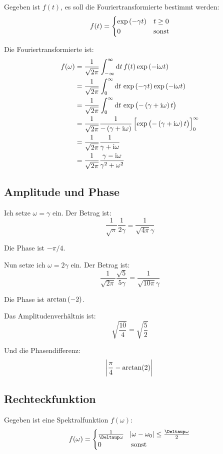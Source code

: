 Gegeben ist $f(t)$, es soll die Fouriertransformierte bestimmt werden:
\[
	f(t) = \begin{cases}
		\exp\del{-\gamma t} & t \geq 0 \\
									  0 & \text{sonst}
	\end{cases}
\]

Die Fouriertransformierte ist:
\begin{align*}
	f(\omega)
	&= \frac{1}{\sqrt{2 \pi}} \int_{-\infty}^\infty \dif t \, f(t) \exp\del{-\ii \omega t} \\
	&= \frac{1}{\sqrt{2 \pi}} \int_0^\infty \dif t \, \exp\del{-\gamma t} \exp\del{-\ii \omega t} \\
	&= \frac{1}{\sqrt{2 \pi}} \int_0^\infty \dif t \, \exp\del{-\del{\gamma + \ii \omega} t} \\
	&= \frac{1}{\sqrt{2 \pi}} \frac{1}{-\del{\gamma + \ii \omega}} \sbr{\exp\del{-\del{\gamma + \ii \omega} t}}_0^\infty \\
	&= \frac{1}{\sqrt{2 \pi}} \frac{1}{\gamma + \ii \omega} \\
	&= \frac{1}{\sqrt{2 \pi}} \frac{\gamma - \ii \omega}{\gamma^2 + \omega^2} \\
\end{align*}

\subsection{Amplitude und Phase}

Ich setze $\omega = \gamma$ ein. Der Betrag ist:
\[
	\frac{1}{\sqrt{\pi}} \frac{1}{2 \gamma} = \frac{1}{\sqrt{4 \pi} \gamma}
\]

Die Phase ist $- \pi / 4$.

Nun setze ich $\omega = 2 \gamma$ ein. Der Betrag ist:
\[
	\frac{1}{\sqrt{2 \pi}} \frac{\sqrt{5}}{5 \gamma} = \frac{1}{\sqrt{10 \pi} \gamma}
\]

Die Phase ist $\arctan\del{-2}$.

Das Amplitudenverhältnis ist:
\[
	\sqrt{\frac{10}{4}} = \sqrt{\frac 52}
\]

Und die Phasendifferenz:
\[
	\abs{\frac \pi4 - \arctan(2)}
\]

\subsection{Rechteckfunktion}

Gegeben ist eine Spektralfunktion $f(\omega)$:
\[
	f(\omega) = \begin{cases}
		\frac 1{\Deltaup \omega} & \abs{\omega - \omega_0} \leq \frac{\Deltaup \omega}2 \\
											  0 & \text{sonst}
	\end{cases}
\]

